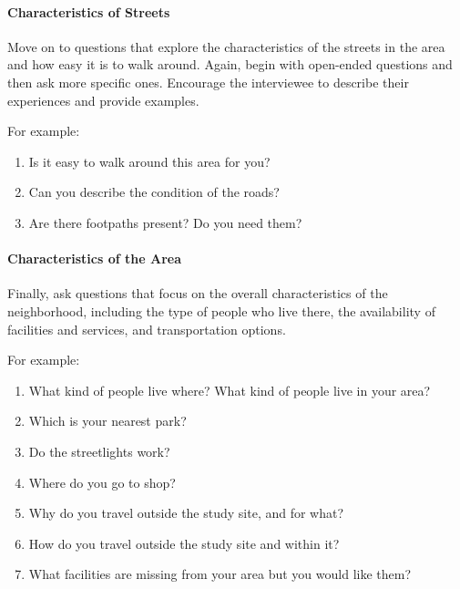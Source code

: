 \documentclass[
]{latex/krantz}
\providecommand{\tightlist}{%
  \setlength{\itemsep}{0pt}\setlength{\parskip}{0pt}}
\begin{document}
\hypertarget{characteristics-of-streets}{%
\paragraph*{Characteristics of Streets}\label{characteristics-of-streets}}

Move on to questions that explore the characteristics of the streets in the area and how easy it is to walk around. Again, begin with open-ended questions and then ask more specific ones. Encourage the interviewee to describe their experiences and provide examples.

For example:

\begin{enumerate}
\def\labelenumi{\arabic{enumi}.}
\tightlist
\item
  Is it easy to walk around this area for you?
\item
  Can you describe the condition of the roads?
\item
  Are there footpaths present? Do you need them?
\end{enumerate}

\hypertarget{characteristics-of-the-area}{%
\paragraph*{Characteristics of the Area}\label{characteristics-of-the-area}}

Finally, ask questions that focus on the overall characteristics of the neighborhood, including the type of people who live there, the availability of facilities and services, and transportation options.

For example:

\begin{enumerate}
\def\labelenumi{\arabic{enumi}.}
\tightlist
\item
  What kind of people live where? What kind of people live in your area?
\item
  Which is your nearest park?
\item
  Do the streetlights work?
\item
  Where do you go to shop?
\item
  Why do you travel outside the study site, and for what?
\item
  How do you travel outside the study site and within it?
\item
  What facilities are missing from your area but you would like them?
\end{enumerate}
\end{document}
